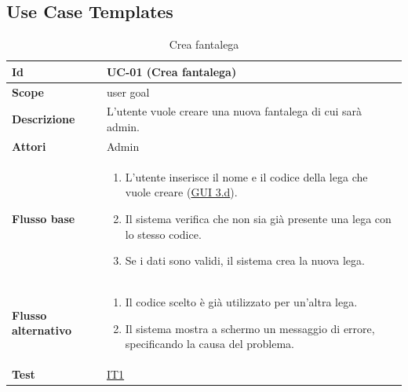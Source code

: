 
\subsection{Use Case Templates}

\begin{table}[H]
\caption{Crea fantalega}
\label{UC-01}

\begin{tabularx}{\textwidth}{|l|X|}
\hline
\textbf{Id} & UC-01 (Crea fantalega) \\
\hline
\textbf{Scope} & user goal \\
\hline
\textbf{Descrizione} & L'utente vuole creare una nuova fantalega di cui sarà admin. \\
\hline
\textbf{Attori} & Admin \\
\hline
\textbf{Flusso base} &
\begin{enumerate}[leftmargin=*]
    \item L'utente inserisce il nome e il codice della lega che vuole creare (\hyperref[fig:mockup_parte3]{GUI 3.d}).
    \item Il sistema verifica che non sia già presente una lega con lo stesso codice.
    \item Se i dati sono validi, il sistema crea la nuova lega.
\end{enumerate} \\
\hline
\textbf{Flusso alternativo} &
\begin{enumerate}[leftmargin=*,label=2.\arabic*]
    \item Il codice scelto è già utilizzato per un'altra lega.
    \item Il sistema mostra a schermo un messaggio di errore, specificando la causa del problema.
\end{enumerate} \\
\hline
\textbf{Test} & \hyperref[IT1]{IT1} \\
\hline
\end{tabularx}

\end{table}



